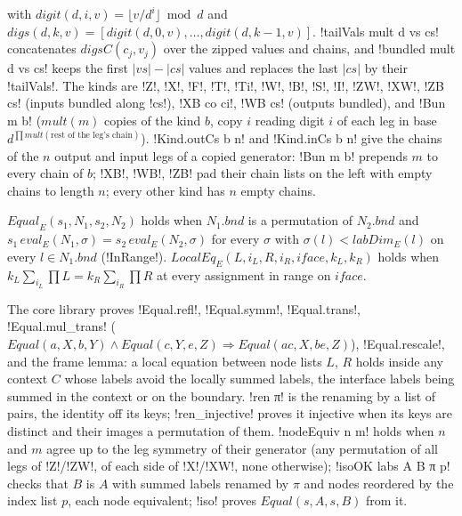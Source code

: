 {with $\mathit{digit}(d,i,v)=\lfloor v/d^i\rfloor \bmod d$ and $\mathit{digs}(d,k,v)=[\mathit{digit}(d,0,v),\dots,\mathit{digit}(d,k-1,v)]$. \lbx!tailVals mult d vs cs! concatenates $\mathit{digsC}(c_j,v_j)$ over the zipped values and chains, and \lbx!bundled mult d vs cs! keeps the first $|vs|-|cs|$ values and replaces the last $|cs|$ by their \lbx!tailVals!. The kinds are \lbx!Z!, \lbx!X!, \lbx!F!, \lbx!T!, \lbx!Ti!, \lbx!W!, \lbx!B!, \lbx!S!, \lbx!I!, \lbx!ZW!, \lbx!XW!, \lbx!ZB cs! (inputs bundled along \lbx!cs!), \lbx!XB co ci!, \lbx!WB cs! (outputs bundled), and \lbx!Bun m b! ($\mathit{mult}(m)$ copies of the kind $b$, copy $i$ reading digit $i$ of each leg in base $d^{\prod \mathit{mult}(\text{rest of the leg's chain})}$). \lbx!Kind.outCs b n! and \lbx!Kind.inCs b n! give the chains of the $n$ output and input legs of a copied generator: \lbx!Bun m b! prepends $m$ to every chain of $b$; \lbx!XB!, \lbx!WB!, \lbx!ZB! pad their chain lists on the left with empty chains to length $n$; every other kind has $n$ empty chains.

\begin{definition}\label{def:boxes-equal}
$\mathit{Equal}_E(s_1,N_1,s_2,N_2)$ holds when $N_1.\mathit{bnd}$ is a permutation of $N_2.\mathit{bnd}$ and $s_1\,\mathit{eval}_E(N_1,\sigma)=s_2\,\mathit{eval}_E(N_2,\sigma)$ for every $\sigma$ with $\sigma(l)<\mathit{labDim}_E(l)$ on every $l\in N_1.\mathit{bnd}$ (\lbx!InRange!). $\mathit{LocalEq}_E(L,i_L,R,i_R,\mathit{iface},k_L,k_R)$ holds when $k_L\sum_{i_L}\prod L=k_R\sum_{i_R}\prod R$ at every assignment in range on $\mathit{iface}$.
\end{definition}

The core library proves \lbx!Equal.refl!, \lbx!Equal.symm!, \lbx!Equal.trans!, \lbx!Equal.mul_trans! ($\mathit{Equal}(a,X,b,Y)\wedge\mathit{Equal}(c,Y,e,Z)\Rightarrow\mathit{Equal}(ac,X,be,Z)$), \lbx!Equal.rescale!, and the frame lemma: a local equation between node lists $L$, $R$ holds inside any context $C$ whose labels avoid the locally summed labels, the interface labels being summed in the context or on the boundary. \lbx!ren π! is the renaming by a list of pairs, the identity off its keys; \lbx!ren_injective! proves it injective when its keys are distinct and their images a permutation of them. \lbx!nodeEquiv n m! holds when $n$ and $m$ agree up to the leg symmetry of their generator (any permutation of all legs of \lbx!Z!/\lbx!ZW!, of each side of \lbx!X!/\lbx!XW!, none otherwise); \lbx!isoOK labs A B π p! checks that $B$ is $A$ with summed labels renamed by $\pi$ and nodes reordered by the index list $p$, each node equivalent; \lbx!iso! proves $\mathit{Equal}(s,A,s,B)$ from it.

}
